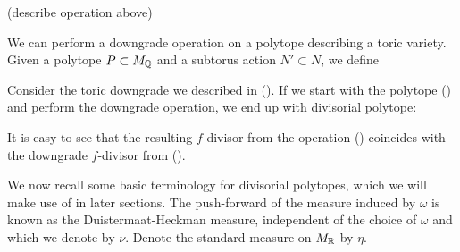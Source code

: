 (describe operation above)

We can perform a downgrade operation on a polytope describing a toric variety. Given a polytope \(P \subset M_{\mathbb{Q}}\) and a subtorus action \(N' \subset N\), we define
\begin{example}
Consider the toric downgrade we described in (). If we start with the polytope () and perform the downgrade operation, we end up with divisorial polytope:

\begin{figure}[H]
\centering

\label{fig:data230b}
\end{figure}

It is easy to see that the resulting \(f\)-divisor from the operation () coincides with the downgrade \(f\)-divisor from ().
\end{example}
We now recall some basic terminology for divisorial polytopes, which we will make use of in later sections. The push-forward of the measure induced by \(\omega\) is known as the Duistermaat-Heckman measure, independent of the choice of \(\omega\) and which we denote by \(\nu\). Denote the standard measure on \(M_{\mathbb{R}}\) by \(\eta\).


